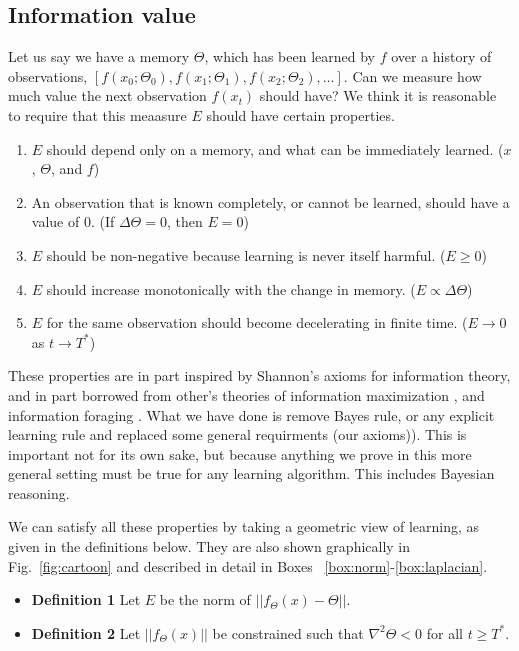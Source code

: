\subsection{Information value} 
Let us say we have a memory $\Theta$, which has been learned by $f$ over a history of observations, $[f(x_0; \Theta_0), f(x_1; \Theta_1), f(x_2; \Theta_2), \ldots]$. Can we measure how much value the next observation $f(x_t)$ should have? We think it is reasonable to require that this meaasure $E$ should have certain properties.

\begin{enumerate}
	\item $E$ should depend only on a memory, and what can be immediately learned. ($x$, $\Theta$, and $f$)
	\item An observation that is known completely, or cannot be learned, should have a value of 0. (If $\Delta \Theta = 0$, then $E=0$)
	\item $E$ should be non-negative because learning is never itself harmful. ($E \ge 0$)
	\item $E$ should increase monotonically with the change in memory. ($E \propto \Delta \Theta$)
	\item $E$ for the same observation should become decelerating in finite time. ($E \rightarrow 0$ as $t \rightarrow T^*$)
\end{enumerate}

These properties are in part inspired by Shannon's axioms for information theory, and in part borrowed from other's theories of information maximization \cite{Itti2009,Jaegle2019,Schmidhuber1991}, and information foraging \citep{Inglis2001,Reddy2016,Pirolli2007}. What we have done is remove Bayes rule, or any explicit learning rule and replaced some general requirments (our axioms)). This is important not for its own sake, but because anything we prove in this more general setting must be true for any learning algorithm. This includes Bayesian reasoning. 

We can satisfy all these properties by taking a geometric view of learning, as given in the definitions below. They are also shown graphically in Fig.~\ref{fig:cartoon} and described in detail in Boxes ~\ref{box:norm}-\ref{box:laplacian}.

\begin{itemize}
	\item[] \textbf{Definition 1} Let $E$ be the norm of $|| f_{\Theta}(x) - \Theta ||$.	
	\item[] \textbf{Definition 2} Let $|| f_{\Theta}(x)||$ be constrained such that $\nabla^2 \Theta < 0$ for all $ t \ge T^*$. 	
\end{itemize}

